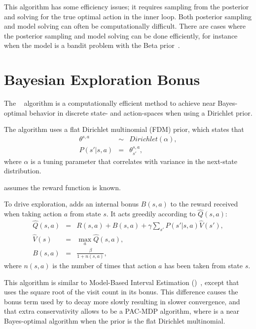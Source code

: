 This algorithm has some efficiency issues; it requires sampling from the posterior and solving for the true optimal action in the inner loop. Both posterior sampling and model solving can often be computationally difficult. There are cases where the posterior sampling and model solving can be done efficiently, for instance when the model is a bandit problem with the Beta prior~\cite{wang05}.



\section{Bayesian Exploration Bonus}

The ~\cite{kolter09} algorithm is a computationally efficient method to achieve near Bayes-optimal behavior in discrete state- and action-spaces when using a Dirichlet prior.

The algorithm uses a flat Dirichlet multinomial (FDM) prior, which states that
\begin{eqnarray}
\theta^{s,a}&\sim&Dirichlet(\alpha),\\
P(s'|s,a)&=&\theta^{s,a}_{s'},
\end{eqnarray}
where $\alpha$ is a tuning parameter that correlates with variance in the next-state distribution.

 assumes the reward function is known.

To drive exploration,  adds an internal bonus $B(s,a)$ to the reward received when taking action $a$ from state $s$. It acts greedily according to $\hat Q(s,a)$:
\begin{eqnarray}
\hat Q(s,a)&=&R(s,a)+B(s,a)+\gamma \sum_{s'} P(s'|s,a)\hat V(s'),\\
\hat V(s)&=& \max_a \hat Q(s, a),\\
\label{eqn:rel:beb:bonus}
B(s,a)&=&\frac\beta{1+n(s,a)},
\end{eqnarray}
where $n(s,a)$ is the number of times that action $a$ has been taken from state $s$.

This algorithm is similar to Model-Based Interval Estimation ()~\cite{strehl06}, except that  uses the square root of the visit count in its bonus. This difference causes the bonus term used by  to decay more slowly resulting in slower convergence, and that extra conservativity allows  to be a PAC-MDP algorithm, where  is a near Bayes-optimal algorithm when the prior is the flat Dirichlet multinomial.

